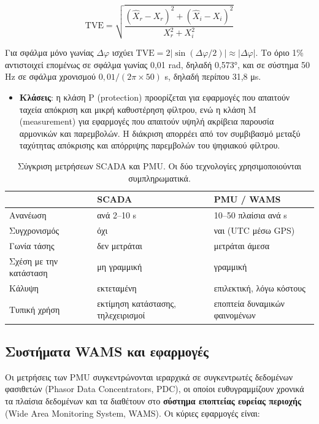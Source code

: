 \begin{equation}
\mathrm{TVE} = \sqrt{\frac{(\hat{X}_r - X_r)^2 + (\hat{X}_i - X_i)^2}{X_r^2 + X_i^2}}
\label{eq:tve}
\end{equation}

Για σφάλμα μόνο γωνίας $\Delta\varphi$ ισχύει
$\mathrm{TVE} = 2\left|\sin(\Delta\varphi/2)\right| \approx |\Delta\varphi|$. Το όριο 1\%
αντιστοιχεί επομένως σε σφάλμα γωνίας 0,01 rad, δηλαδή 0,573°, και σε σύστημα 50 Hz σε σφάλμα
χρονισμού $0{,}01 / (2\pi \times 50)$ s, δηλαδή περίπου 31,8 μs.

\begin{itemize}
\item \textbf{Κλάσεις}: η κλάση P (protection) προορίζεται για εφαρμογές που απαιτούν ταχεία
      απόκριση και μικρή καθυστέρηση φίλτρου, ενώ η κλάση M (measurement) για εφαρμογές
      που απαιτούν υψηλή ακρίβεια παρουσία αρμονικών και παρεμβολών. Η διάκριση απορρέει
      από τον συμβιβασμό μεταξύ ταχύτητας απόκρισης και απόρριψης παρεμβολών του
      ψηφιακού φίλτρου.
\end{itemize}

\begin{table}[!htbp]
\centering
\begin{tabular}{lll}
\hline
 & SCADA & PMU / WAMS \\
\hline
Ανανέωση         & ανά 2--10 s        & 10--50 πλαίσια ανά s \\
Συγχρονισμός     & όχι                & ναι (UTC μέσω GPS) \\
Γωνία τάσης      & δεν μετράται       & μετράται άμεσα \\
Σχέση με την κατάσταση & μη γραμμική & γραμμική \\
Κάλυψη           & εκτεταμένη         & επιλεκτική, λόγω κόστους \\
Τυπική χρήση     & εκτίμηση κατάστασης, τηλεχειρισμοί & εποπτεία δυναμικών φαινομένων \\
\hline
\end{tabular}
\caption{Σύγκριση μετρήσεων SCADA και PMU. Οι δύο τεχνολογίες χρησιμοποιούνται
συμπληρωματικά.}
\label{tab:scada-pmu}
\end{table}

\subsection{Συστήματα WAMS και εφαρμογές}

Οι μετρήσεις των PMU συγκεντρώνονται ιεραρχικά σε συγκεντρωτές δεδομένων φασιθετών (Phasor
Data Concentrators, PDC), οι οποίοι ευθυγραμμίζουν χρονικά τα πλαίσια δεδομένων και τα
διαθέτουν στο \textbf{σύστημα εποπτείας ευρείας περιοχής} (Wide Area Monitoring System,
WAMS). Οι κύριες εφαρμογές είναι:

